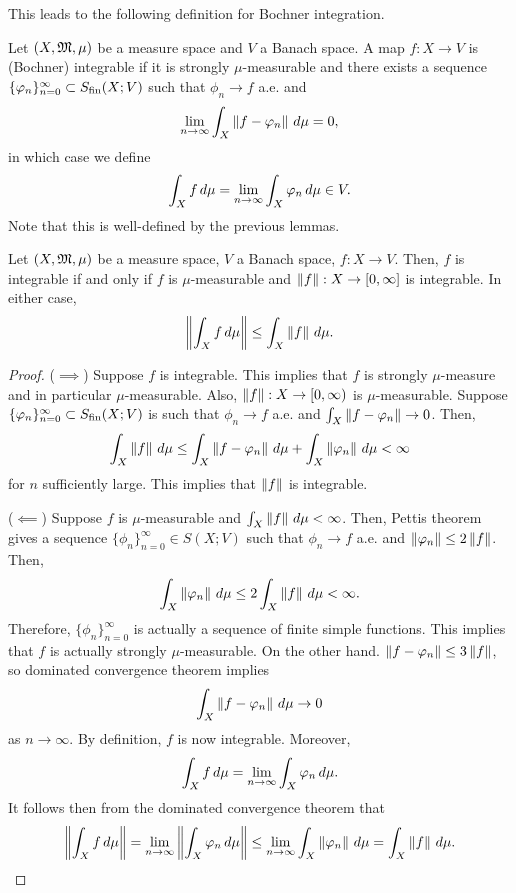\documentclass[a4paper]{article}
\renewcommand{\seqinfn}[1]{\{ #1 \}_{n=0}^\infty}
\begin{document}
This leads to the following definition for Bochner integration.

\begin{defi}
Let $(X, \mathfrak{M}, \mu)$ be a measure space and $V$ a Banach space.
A map $f : X \to V$ is (Bochner) integrable if
it is strongly $\mu$-measurable and there exists a sequence
$\seqinfn{\phi_n} \subset \Sfin(X; V)$ such that $\phi_n \to f$
a.e. and
\[
\lim_{n \to \infty} \int_X \left\lVert f - \varphi_n\right\rVert \, d \mu = 0,
\]
in which case we define
\[
\int_X f \, d \mu = \lim_{n \to \infty} \int_X \varphi_n \, d \mu \in V.
\]
Note that this is well-defined by the previous lemmas.
\end{defi}

\begin{thm}
Let $(X, \mathfrak{M}, \mu)$ be a measure space, $V$ a Banach space,
$f : X \to V$. Then,
$f$ is integrable if and only if $f$ is $\mu$-measurable
and $\left\lVert f\right\rVert : X \to [0, \infty]$ is integrable.
In either case,
\[
\left\lVert \int_X f \, d \mu\right\rVert \leq \int_X \left\lVert f\right\rVert \, d \mu.
\]
\end{thm}

\begin{proof}
($\implies$) Suppose $f$ is integrable. This implies that
$f$ is strongly $\mu$-measure and in particular $\mu$-measurable.
Also, $\left\lVert f\right\rVert : X \to [0, \infty)$ is $\mu$-measurable.
Suppose $\seqinfn{\phi_n} \subset \Sfin(X; V)$ is such that
$\phi_n \to f$ a.e. and $\int_X \left\lVert f - \varphi_n\right\rVert \to 0$.
Then,
\[
\begin{aligned}
\int_X \left\lVert f\right\rVert \, d \mu
\leq \int_X \left\lVert f - \varphi_n\right\rVert \, d \mu + \int_X \left\lVert \varphi_n\right\rVert
\, d \mu < \infty
\end{aligned}
\]
for $n$ sufficiently large. This implies that $\left\lVert f\right\rVert$
is integrable.

($\impliedby$) Suppose $f$ is $\mu$-measurable and
$\int_X \left\lVert f\right\rVert \, d \mu < \infty$. Then, Pettis theorem
gives a sequence $\seqinfn{\phi_n} \in S(X; V)$ such that
$\phi_n \to f$ a.e. and $\left\lVert \varphi_n\right\rVert \leq 2\left\lVert f\right\rVert$.
Then,
\[
\int_X \left\lVert \varphi_n\right\rVert \, d \mu \leq 2 \int_X \left\lVert f\right\rVert \, d \mu
< \infty.
\]
Therefore, $\seqinfn{\phi_n}$ is actually a sequence of
finite simple functions. This implies that
$f$ is actually strongly $\mu$-measurable. On the other hand.
$\left\lVert f - \varphi_n\right\rVert \leq 3\left\lVert f\right\rVert$, so
dominated convergence theorem implies
\[
\int_X \left\lVert f - \varphi_n\right\rVert \, d \mu \to 0
\]
as $n \to \infty$. By definition, $f$ is now integrable.
Moreover,
\[
\int_X f \, d \mu = \lim_{n \to \infty} \int_X \varphi_n \, d \mu.
\]
It follows then from the dominated convergence theorem that
\[
\begin{aligned}
\left\lVert \int_X f \, d \mu\right\rVert
= \lim_{n \to \infty} \left\lVert \int_X \varphi_n \, d \mu\right\rVert
\leq \lim_{n \to \infty} \int_X \left\lVert \varphi_n\right\rVert \, d \mu
= \int_X \left\lVert f\right\rVert \, d \mu.
\end{aligned}
\]
\end{proof}
\end{document}
